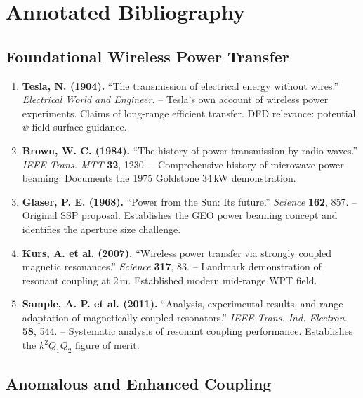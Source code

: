 \documentclass[11pt,a4paper]{article}
\begin{document}
\section{Annotated Bibliography}

\subsection{Foundational Wireless Power Transfer}

\begin{enumerate}
\item \textbf{Tesla, N. (1904).} ``The transmission of electrical energy
without wires.'' \textit{Electrical World and Engineer.}
-- Tesla's own account of wireless power experiments. Claims of
long-range efficient transfer. DFD relevance: potential $\psi$-field
surface guidance.

\item \textbf{Brown, W. C. (1984).} ``The history of power transmission
by radio waves.'' \textit{IEEE Trans. MTT} \textbf{32}, 1230.
-- Comprehensive history of microwave power beaming. Documents
the 1975 Goldstone 34\,kW demonstration.

\item \textbf{Glaser, P. E. (1968).} ``Power from the Sun: Its future.''
\textit{Science} \textbf{162}, 857.
-- Original SSP proposal. Establishes the GEO power beaming concept
and identifies the aperture size challenge.

\item \textbf{Kurs, A. et al. (2007).} ``Wireless power transfer via
strongly coupled magnetic resonances.'' \textit{Science} \textbf{317}, 83.
-- Landmark demonstration of resonant coupling at 2\,m. Established
modern mid-range WPT field.

\item \textbf{Sample, A. P. et al. (2011).} ``Analysis, experimental
results, and range adaptation of magnetically coupled resonators.''
\textit{IEEE Trans. Ind. Electron.} \textbf{58}, 544.
-- Systematic analysis of resonant coupling performance. Establishes
the $k^2 Q_1 Q_2$ figure of merit.
\end{enumerate}

\subsection{Anomalous and Enhanced Coupling}
\end{document}
